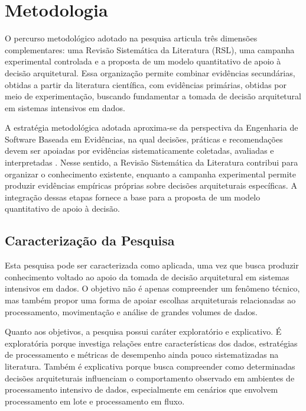 \chapter{Metodologia}
\label{cap:metodologia}

O percurso metodológico adotado na pesquisa articula três dimensões complementares: uma Revisão Sistemática da Literatura (RSL), uma campanha experimental controlada e a proposta de um modelo quantitativo de apoio à decisão arquitetural. Essa organização permite combinar evidências secundárias, obtidas a partir da literatura científica, com evidências primárias, obtidas por meio de experimentação, buscando fundamentar a tomada de decisão arquitetural em sistemas intensivos em dados.

A estratégia metodológica adotada aproxima-se da perspectiva da Engenharia de Software Baseada em Evidências, na qual decisões, práticas e recomendações devem ser apoiadas por evidências sistematicamente coletadas, avaliadas e interpretadas \cite{kitchenham2015evidence}. Nesse sentido, a Revisão Sistemática da Literatura contribui para organizar o conhecimento existente, enquanto a campanha experimental permite produzir evidências empíricas próprias sobre decisões arquiteturais específicas. A integração dessas etapas fornece a base para a proposta de um modelo quantitativo de apoio à decisão.

\section{Caracterização da Pesquisa}
\label{sec:caracterizacao-pesquisa}

Esta pesquisa pode ser caracterizada como aplicada, uma vez que busca produzir conhecimento voltado ao apoio da tomada de decisão arquitetural em sistemas intensivos em dados. O objetivo não é apenas compreender um fenômeno técnico, mas também propor uma forma de apoiar escolhas arquiteturais relacionadas ao processamento, movimentação e análise de grandes volumes de dados.

Quanto aos objetivos, a pesquisa possui caráter exploratório e explicativo. É exploratória porque investiga relações entre características dos dados, estratégias de processamento e métricas de desempenho ainda pouco sistematizadas na literatura. Também é explicativa porque busca compreender como determinadas decisões arquiteturais influenciam o comportamento observado em ambientes de processamento intensivo de dados, especialmente em cenários que envolvem processamento em lote e processamento em fluxo.

